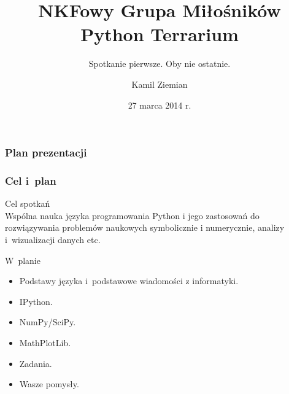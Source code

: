 \documentclass[10pt,t]{beamer}
\title[Terrarium]{NKFowy Grupa Miłośników Python
  Terrarium}
\subtitle{Spotkanie pierwsze. Oby nie ostatnie.}
\author{Kamil Ziemian}
\institute{Uniwersytet Jagielloński w~Krakowie}
\date[27 III 2014]{27 marca 2014 r.}
\begin{document}






\RaggedRight





\maketitle %





\begin{frame}
  \frametitle{Plan prezentacji}


  \tableofcontents %

\end{frame}





\begin{frame}
  \frametitle{Cel i~plan}


  Cel spotkań \\
  Wspólna nauka języka programowania Python i jego zastosowań do
  rozwiązywania problemów naukowych symbolicznie i numerycznie, analizy
  i~wizualizacji danych etc.

  W~planie
  \begin{itemize}
    \RaggedRight

  \item Podstawy języka i~podstawowe wiadomości z informatyki.

  \item IPython.

  \item NumPy/SciPy.

  \item MathPlotLib.

  \item Zadania.

  \item Wasze pomysły.

  \end{itemize}

\end{frame}
\end{document}
